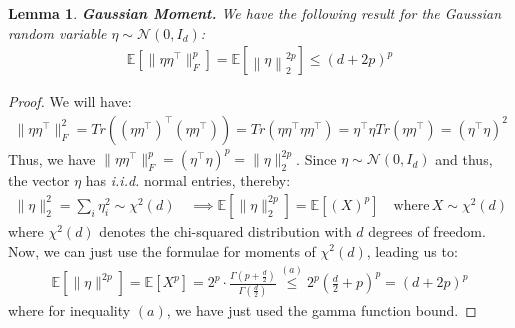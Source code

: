 \documentclass{article}
\newtheorem{lemma}{Lemma}[section]
\begin{document}
\begin{lemma}
\label{Gaussian_integ}
    \textbf{Gaussian Moment.} We have the following result for the Gaussian random variable $\eta \sim \mathcal{N}(0,I_d)$:
    \begin{align*}
        \mathbb{E}\left[\|\eta \eta^\top\|^p_F\right] =\mathbb{E}\left[\left\|\eta\right\|^{2p}_2\right]\leq (d+2p)^p
    \end{align*}
\end{lemma}
\begin{proof}
    We will have:
    \begin{align*}
        \|\eta \eta^\top\|^2_F = Tr\left((\eta\eta^\top)^\top(\eta\eta^\top)\right) = Tr\left(\eta\eta^\top\eta \eta^\top\right) = \eta^\top\eta Tr(\eta\eta^\top) = (\eta^\top\eta)^2
    \end{align*}
    Thus, we have $\|\eta \eta^\top\|^p_F = (\eta^\top\eta)^p = \|\eta\|^{2p}_2$. Since $\eta \sim \mathcal{N}(0,I_d)$ and thus, the vector $\eta$ has \textit{i.i.d.} normal entries, thereby:
    \begin{align*}
        \|\eta\|^2_2 = \sum_i \eta^2_i \sim \chi^2(d) \quad  \implies  \mathbb{E}[\|\eta\|^{2p}_2] = \mathbb{E}[ (X)^p] \quad \text{where} \, X\sim \chi^2(d)
    \end{align*}
    where $\chi^2(d)$ denotes the chi-squared distribution with $d$ degrees of freedom. Now, we can just use the formulae for moments of $\chi^2(d)$, leading us to:
    \begin{align*}
        \mathbb{E}\left[\|\eta\|^{2p}\right] = \mathbb{E}[X^p] = 2^{p}\cdot\frac{\Gamma (p+\frac{d}{2})}{\Gamma(\frac{d}{2})} \overset{(a) }{ \leq} 2^p \left(\frac{d}{2}+p\right)^p = (d+2p)^p
    \end{align*}
    where  for inequality $(a)$, we have just used the gamma function bound.
\end{proof}
\end{document}
